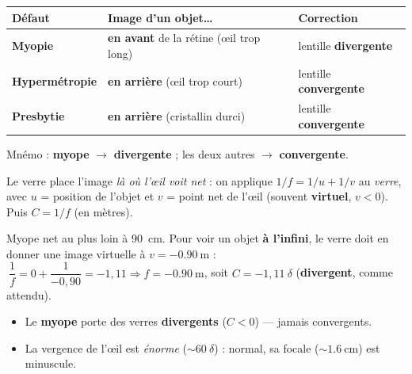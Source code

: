 \documentclass[11pt,a4paper]{article}
\begin{document}
\begin{cle}
\begin{center}\small
\renewcommand{\arraystretch}{1.25}
\begin{tabular}{>{\bfseries}l l l}
\toprule
Défaut & Image d'un objet\ldots & Correction \\
\midrule
\rowcolor{attncol!8} Myopie & \textbf{en avant} de la rétine (\oe il trop long) & lentille \textbf{divergente} \\
Hypermétropie & \textbf{en arrière} (\oe il trop court) & lentille \textbf{convergente} \\
\rowcolor{defcol!8} Presbytie & \textbf{en arrière} (cristallin durci) & lentille \textbf{convergente} \\
\bottomrule
\end{tabular}
\end{center}
Mnémo : \textbf{myope} $\to$ \textbf{divergente} ; les deux autres $\to$ \textbf{convergente}.
\end{cle}

\begin{methode}
Le verre place l'image \emph{là où l'\oe il voit net} : on applique $1/f=1/u+1/v$ au \emph{verre}, avec
$u$ = position de l'objet et $v$ = point net de l'\oe il (souvent \textbf{virtuel}, $v<0$). Puis
$C=1/f$ (en mètres).
\end{methode}

\begin{exemplebox}
Myope net au plus loin à \qty{90}{\cm}. Pour voir un objet \textbf{à l'infini}, le verre doit en donner
une image virtuelle à $v=-\qty{0.90}{\m}$ :
$\ \dfrac{1}{f}=0+\dfrac{1}{-0{,}90}=-1{,}11 \Rightarrow f=-\qty{0.90}{\m}$, soit $C=-1{,}11~\delta$
(\textbf{divergent}, comme attendu).
\end{exemplebox}

\begin{piege}
\begin{itemize}[leftmargin=1.5em,topsep=2pt,itemsep=1pt]
  \item Le \textbf{myope} porte des verres \textbf{divergents} ($C<0$) --- jamais convergents.
  \item La vergence de l'\oe il est \emph{énorme} ($\sim 60~\delta$) : normal, sa focale
        ($\sim\qty{1.6}{\cm}$) est minuscule.
\end{itemize}
\end{piege}
\end{document}
